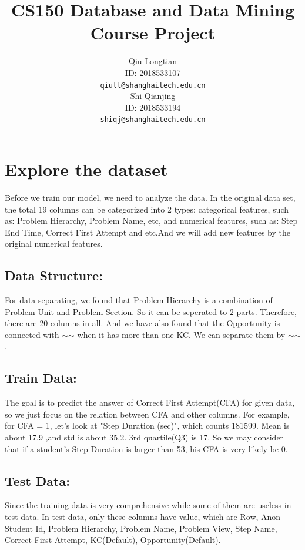\documentclass{article}
\title{CS150 Database and Data Mining\\Course Project}
\author{
  Qiu Longtian\\
  ID: 2018533107\\
  \texttt{qiult@shanghaitech.edu.cn} \\
   \And
  Shi 	Qianjing\\
  ID: 2018533194\\
  \texttt{shiqj@shanghaitech.edu.cn}
}
\begin{document}

\maketitle


\section{Explore the dataset}
Before we train our model, we need to analyze the data.
In the original data set, the total 19 columns can be categorized into 2 types: categorical features, such as: Problem Hierarchy, Problem Name, etc, and numerical features, such as: Step End Time, Correct First Attempt and etc.And we will add new features by the original numerical features.
	\subsection{Data Structure:}
	For data separating, we found that Problem Hierarchy is a combination of Problem Unit and Problem Section. So it can be seperated to 2 parts. Therefore, there are 20 columns in all. And we have also found that the Opportunity is connected with $ \sim $$ \sim $ when it has more than one KC. We can separate them by $ \sim $$ \sim $.
	\subsection{Train Data:}
	The goal is to predict the answer of Correct First Attempt(CFA) for given data, so we just focus on the relation between CFA and other columns. For example, for CFA = 1, let's look at "Step Duration (sec)", which counts 181599. Mean is about 17.9 ,and std is about 35.2. 3rd quartile(Q3) is 17. So we may consider that if a student's Step Duration is larger than 53, his CFA is very likely be 0.

	\subsection{Test Data:}
	Since the training data is very comprehensive while some of them are useless in test data. In test data, only these columns have value, which are Row, Anon Student Id, Problem Hierarchy, Problem Name, Problem View, Step Name, Correct First Attempt, KC(Default), Opportunity(Default). 
\end{document}
